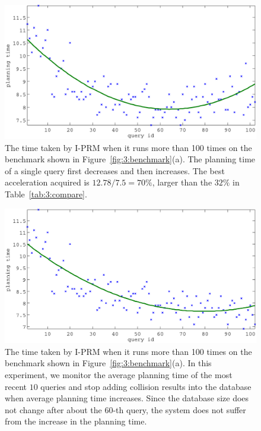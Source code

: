\begin{figure}[t]
  \centering
  \includegraphics[width=0.8\linewidth]{figs/3/curve1-crop.pdf}
  \caption[Time taken by I-PRM when it runs more than 100 times on the benchmark shown Figure~\ref{fig:3:benchmark}(a). The planning time first decreases and then increases because I-PRM continues updating the dataset in well-learned regions]{\label{fig:3:curve} The time taken by I-PRM when it runs more than 100 times on the benchmark shown in Figure~\ref{fig:3:benchmark}(a). The planning time of a single query first decreases and then increases. The best acceleration acquired is $12.78/7.5 = 70\%$, larger than the $32\%$ in Table~\ref{tab:3:compare}.}
\end{figure}
\begin{figure}[t]
  \centering
  \includegraphics[width=0.8\linewidth]{figs/3/curve2-crop.pdf}
  \caption[Time taken by I-PRM when it runs more than 100 times on the benchmark shown Figure~\ref{fig:3:benchmark}(a). The planning time always decreases because I-PRM stops updating the dataset in well-learned regions]{\label{fig:3:curve2} The time taken by I-PRM when it runs more than 100 times on the benchmark shown in Figure~\ref{fig:3:benchmark}(a). In this experiment, we monitor the average planning time of the most recent $10$ queries and stop adding collision results into the database when average planning time increases. Since the database size does not change after about the $60$-th query, the system does not suffer from the increase in the planning time. }
\end{figure}



